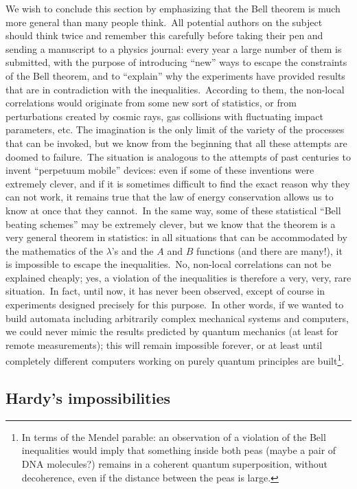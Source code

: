 \documentclass[12pt,onecolumn]{article}%
\begin{document}
We wish to conclude this section by emphasizing that the Bell theorem is much
more general than many people think.\ All potential authors on the subject
should think twice and remember this carefully before taking their pen and
sending a manuscript to a physics journal: every year a large number of them
is submitted, with the purpose of introducing ``new'' ways to escape the
constraints of the Bell theorem, and to ``explain'' why the experiments have
provided results that are in contradiction with the inequalities.\ According
to them, the non-local correlations would originate from some new sort of
statistics, or from perturbations created by cosmic rays, gas collisions with
fluctuating impact parameters, etc. The imagination is the only limit of the
variety of the processes that can be invoked, but we know from the beginning
that all these attempts are doomed to failure.\ The situation is analogous to
the attempts of past centuries to invent ``perpetuum mobile'' devices: even if
some of these inventions were extremely clever, and if it is sometimes
difficult to find the exact reason why they can not work, it remains true that
the law of energy conservation allows us to know at once that they cannot.\ In
the same way, some of these statistical ``Bell beating schemes'' may be
extremely clever, but we know that the theorem is a very general theorem in
statistics: in all situations that can be accommodated by the mathematics of
the $\lambda$'s and the $A$ and $B$ functions (and there are many!), it is
impossible to escape the inequalities.\ No, non-local correlations can not be
explained cheaply; yes, a violation of the inequalities is therefore a very,
very, rare situation.\ In fact, until now, it has never been observed, except
of course in experiments designed precisely for this purpose.\ In other words,
if we wanted to build automata including arbitrarily complex mechanical
systems and computers, we could never mimic the results predicted by quantum
mechanics (at least for remote measurements); this will remain impossible
forever, or at least until completely different computers working on purely
quantum principles are built\footnote{In terms of the Mendel parable: an
observation of a violation of the Bell inequalities would imply that something
inside both peas (maybe a pair of DNA molecules?) remains in a coherent
quantum superposition, without decoherence, even if the distance between the
peas is large.}.

\subsection{Hardy's impossibilities}
\end{document}
